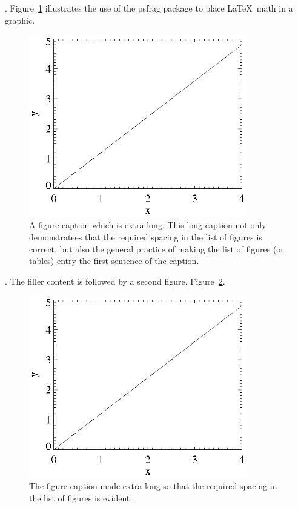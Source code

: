 \lipsum[13].  Figure~\ref{fig:fig01} illustrates the use
of the psfrag package to place \LaTeX\ math in a graphic.%
\begin{figure}[tb]
  \begin{center}
   \includegraphics[width=3.75in]{simple.eps}
  \end{center}
  \caption[A figure caption which is extra long.]{A figure caption
    which is extra long. This long caption not only demonstratees that
    the required spacing in the list of figures is correct, but also
    the general practice of making the list of figures (or tables)
    entry the first sentence of the caption.}
\label{fig:fig01}
\end{figure}
\lipsum[14]. The filler content is followed by a second figure,
Figure~\ref{fig:fig02}.  %
\begin{figure}[tb]
  \begin{center}
   \includegraphics[width=3.75in]{simple.eps}
  \end{center}
  \caption{The figure caption made extra long so that the
    required spacing in the list of figures is evident.}
\label{fig:fig02}
\end{figure}
\lipsum[15]

